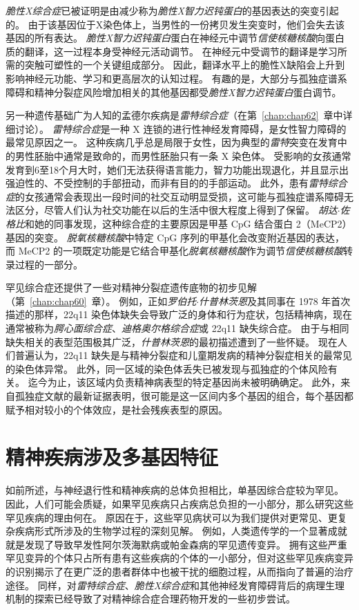 \textit{脆性X综合症}已被证明是由减少称为\textit{脆性X智力迟钝蛋白}的基因表达的突变引起的。
由于该基因位于X染色体上，当男性的一份拷贝发生突变时，他们会失去该基因的所有表达。
\textit{脆性X智力迟钝蛋白}蛋白在神经元中调节\textit{信使核糖核酸}向蛋白质的翻译，这一过程本身受神经元活动调节。
在神经元中受调节的翻译是学习所需的突触可塑性的一个关键组成部分。
因此，翻译水平上的脆性X缺陷会上升到影响神经元功能、学习和更高层次的认知过程。
有趣的是，大部分与孤独症谱系障碍和精神分裂症风险增加相关的其他基因都受\textit{脆性X智力迟钝蛋白}蛋白调节。


另一种遗传基础广为人知的孟德尔疾病是\textit{雷特综合症}（在第~\ref{chap:chap62}~章中详细讨论）。
\textit{雷特综合症}是一种 X 连锁的进行性神经发育障碍，是女性智力障碍的最常见原因之一。
这种疾病几乎总是局限于女性，因为典型的\textit{雷特}突变在发育中的男性胚胎中通常是致命的，而男性胚胎只有一条 X 染色体。
受影响的女孩通常发育到6至18个月大时，她们无法获得语言能力，智力功能出现退化，并且显示出强迫性的、不受控制的手部扭动，而非有目的的手部运动。
此外，患有\textit{雷特综合症}的女孩通常会表现出一段时间的社交互动明显受损，这可能与孤独症谱系障碍无法区分，尽管人们认为社交功能在以后的生活中很大程度上得到了保留。
\textit{胡达$\cdot$佐格比}和她的同事发现，这种综合症的主要原因是甲基 CpG 结合蛋白 2（MeCP2）基因的突变。
\textit{脱氧核糖核酸}中特定 CpG 序列的甲基化会改变附近基因的表达，而 MeCP2 的一项既定功能是它结合甲基化\textit{脱氧核糖核酸}作为调节\textit{信使核糖核酸}转录过程的一部分。



罕见综合症还提供了一些对精神分裂症遗传底物的初步见解（第~\ref{chap:chap60}~章）。
例如，正如\textit{罗伯托$\cdot$什普林茨恩}及其同事在 1978 年首次描述的那样，22q11 染色体缺失会导致广泛的身体和行为症状，包括精神病，现在通常被称为\textit{腭心面综合症}、\textit{迪格奥尔格综合症}或 22q11 缺失综合症。
由于与相同缺失相关的表型范围极其广泛，\textit{什普林茨恩}的最初描述遭到了一些怀疑。
现在人们普遍认为，22q11 缺失是与精神分裂症和儿童期发病的精神分裂症相关的最常见的染色体异常。
此外，同一区域的染色体丢失已被发现与孤独症的个体风险有关。
迄今为止，该区域内负责精神病表型的特定基因尚未被明确确定。
此外，来自孤独症文献的最新证据表明，很可能是这一区间内多个基因的组合，每个基因都赋予相对较小的个体效应，是社会残疾表型的原因。



\section{精神疾病涉及多基因特征}

如前所述，与神经退行性和精神疾病的总体负担相比，单基因综合症较为罕见。
因此，人们可能会质疑，如果罕见疾病只占疾病总负担的一小部分，那么研究这些罕见疾病的理由何在。
原因在于，这些罕见病状可以为我们提供对更常见、更复杂疾病形式所涉及的生物学过程的深刻见解。
例如，人类遗传学的一个显著成就就是发现了导致早发性阿尔茨海默病或帕金森病的罕见遗传变异。
拥有这些严重罕见变异的个体只占所有患有这些疾病的个体的一小部分，但对这些罕见疾病变异的识别揭示了在更广泛的患者群体中也被干扰的细胞过程，从而指向了普遍的治疗途径。
同样，对\textit{雷特综合症}、\textit{脆性X综合症}和其他神经发育障碍背后的病理生理机制的探索已经导致了对精神综合症合理药物开发的一些初步尝试。


